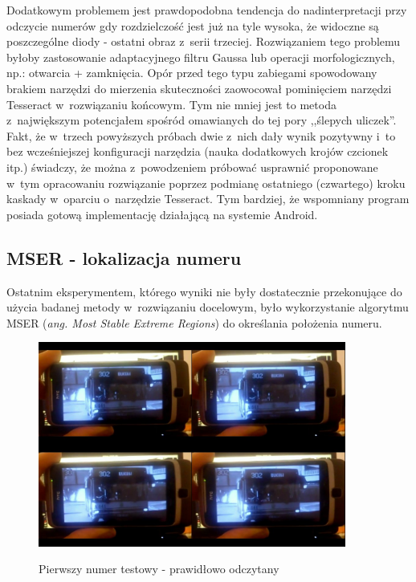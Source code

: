 Dodatkowym problemem jest prawdopodobna tendencja do nadinterpretacji
przy odczycie numerów gdy rozdzielczość jest już na tyle wysoka, że
widoczne są poszczególne diody - ostatni obraz z~serii trzeciej.
Rozwiązaniem tego problemu byłoby zastosowanie adaptacyjnego filtru
Gaussa lub operacji morfologicznych, np.: otwarcia + zamknięcia.
Opór przed tego typu zabiegami spowodowany brakiem narzędzi 
do mierzenia skuteczności zaowocował pominięciem narzędzi Tesseract
w~rozwiązaniu końcowym. Tym nie mniej jest to metoda z~największym
potencjałem spośród omawianych do tej pory ,,ślepych uliczek''. 
Fakt, że w~trzech powyższych próbach dwie z~nich dały wynik pozytywny
i~to bez wcześniejszej konfiguracji narzędzia (nauka dodatkowych
krojów czcionek itp.) świadczy, że można z~powodzeniem próbować
usprawnić proponowane w~tym opracowaniu rozwiązanie poprzez 
podmianę ostatniego (czwartego) kroku kaskady w~oparciu o~narzędzie
Tesseract. Tym bardziej, że wspomniany program posiada gotową
implementację działającą na systemie Android.

\subsection{MSER - lokalizacja numeru}

Ostatnim eksperymentem, którego wyniki nie były dostatecznie przekonujące
do użycia badanej metody w~rozwiązaniu docelowym, było
wykorzystanie algorytmu MSER (\textit{ang. Most Stable Extreme Regions})
do określania położenia numeru.

\begin{figure}[h!]
    \caption{Pierwszy numer testowy - prawidłowo odczytany}
    \centering
    \includegraphics[width=0.9\textwidth]{img/exp_mser_concerns}
    \label{fig:mser_example_results}
\end{figure}

